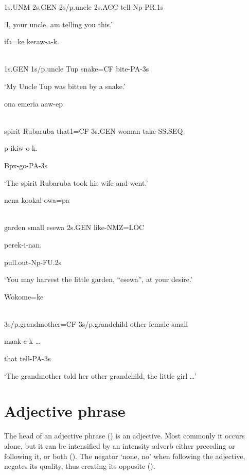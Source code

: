1s.UNM  2s.GEN  2s/p.uncle  2s.ACC  tell-Np-PR.1s

`I, your uncle, am telling you this.'

\ea%
\label{ex:x836}
\gll {}  ifa=ke  keraw-a-k. \\
      \\
\glt
\z

1s.GEN  1s/p.uncle  Tup  snake=CF  bite-PA-3s

`My Uncle Tup was bitten by a snake.'

\ea%
\label{ex:x837}
\gll {}    ona  emeria  aaw-ep  \\
      \\
\glt
\z

spirit  Rubaruba  that1=CF  3s.GEN  woman  take-SS.SEQ  

p-ikiw-o-k.

Bpx-go-PA-3s

`The spirit Rubaruba took his wife and went.'

\ea%
\label{ex:x838}
\gll {}    nena  kookal-owa=pa  \\
      \\
\glt
\z

garden  small  esewa  2s.GEN  like-NMZ=LOC  

perek-i-nan.

pull.out-Np-FU.2s

`You may harvest the little garden, ``esewa'', at your desire.'

\ea%
\label{ex:x839}
\gll Wokome=ke   \\
      \\
\glt
\z

3s/p.grandmother=CF  3s/p.grandchild  other  female  small  

  maak-e-k  {\dots}

that  tell-PA-3s

`The grandmother told her other grandchild, the little girl {\dots}'

\section{Adjective phrase}
\hypertarget{RefHeading21741935131865}{}
The head of an adjective phrase () is an adjective. Most commonly it occurs alone, but it can be intensified by an intensity adverb either preceding or following it, or both ().  The negator  `none, no' when following the adjective, negates its quality, thus creating its opposite ().  

